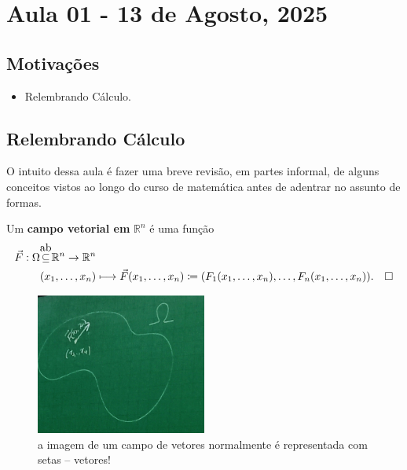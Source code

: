 \documentclass[../differential_forms.tex]{subfiles}
\begin{document}
\section{Aula 01 - 13 de Agosto, 2025}
\subsection{Motivações}
\begin{itemize}
	\item Relembrando Cálculo.
\end{itemize}
\subsection{Relembrando Cálculo}
O intuito dessa aula é fazer uma breve revisão, em partes informal, de alguns conceitos vistos ao longo do curso de matemática antes de adentrar no assunto de formas.
\begin{def*}
	Um \textbf{campo vetorial em }\(\mathbb{R}^{n}\) é uma função
	\begin{align*}
		\vec{F}:\Omega & \ensurestackMath{\stackon[0.6ex]{\subseteq}{\text{ab}}                                                                                                                                   }\mathbb{R}^{n} \rightarrow \mathbb{R}^{n} \\
		               & (x_1, \dotsc , x_{n})\longmapsto \vec{F}(x_1, \dotsc , x_{n}) \coloneqq (F_1(x_1, \dotsc , x_{n}), \dotsc , F_{n}(x_1, \dotsc , x_{n})). \quad \square
	\end{align*}
\end{def*}
\begin{figure}[H]
	\begin{center}
		\includegraphics[height=0.5\textheight, width=0.5\textwidth, keepaspectratio]{./Images/vector_field_01.png}
	\end{center}
	\caption{a imagem de um campo de vetores normalmente é representada com setas -- vetores!}
\end{figure}
\end{document}
